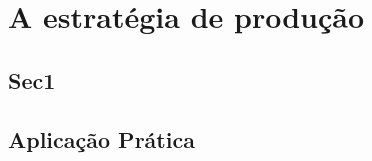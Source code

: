 \chapter{A estratégia de produção} 
\label{chap:estrategia_da_producao} 

\section{Sec1} 
\label{sec:estrategia_da_producao_sec1} 


\section{Aplicação Prática} 
\label{sec:estrategia_da_producao_aplicacao}